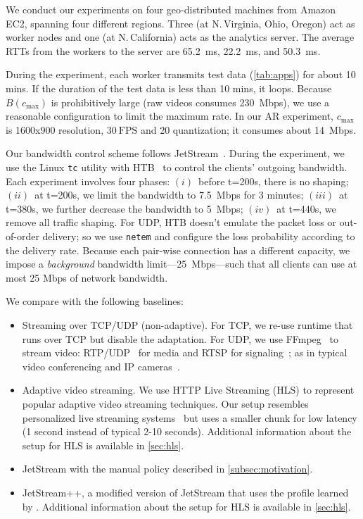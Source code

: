  We conduct our experiments on four geo-distributed
machines from Amazon EC2, spanning four different regions. Three (at
N.\,Virginia, Ohio, Oregon) act as worker nodes and one (at N.\,California) acts
as the analytics server. The average RTTs from the workers to the server are
\SI{65.2}{\ms}, \SI{22.2}{\ms}, and \SI{50.3}{ms}.

During the experiment, each worker transmits test data (\autoref{tab:apps}) for
about 10 mins. If the duration of the test data is less than 10 mins, it
loops. Because $B(c_{\max})$ is prohibitively large (raw videos consumes
\SI{230}{Mbps}), we use a reasonable configuration to limit the maximum rate. In
our AR experiment, $c_{\max}$ is 1600x900 resolution, \(30~\text{FPS}\) and 20
quantization; it consumes about \SI{14}{Mbps}.

Our bandwidth control scheme follows JetStream~\cite{rabkin2014aggregation}.
During the experiment, we use the Linux \texttt{tc} utility with HTB~\cite{htb,
  lartc} to control the clients' outgoing bandwidth. Each experiment involves
four phases: $(i)$~before t=200s, there is no shaping; $(ii)$~at t=200s, we
limit the bandwidth to \SI{7.5}{Mbps} for 3 minutes; $(iii)$~at t=380s, we
further decrease the bandwidth to \SI{5}{Mbps}; $(iv)$~at t=440s, we remove all
traffic shaping. For UDP, HTB doesn't emulate the packet loss or out-of-order
delivery; so we use \texttt{netem} and configure the loss probability according
to the delivery rate. Because each pair-wise connection has a different
capacity, we impose a \textit{background} bandwidth limit---\SI{25}{Mbps}---such
that all clients can use at most 25 Mbps of network bandwidth.

We compare \sysname{} with the following baselines:

\begin{itemize}

\item Streaming over TCP/UDP (non-adaptive). For TCP, we re-use \sysname{}
  runtime that runs over TCP but disable the adaptation. For UDP, we use
  FFmpeg~\cite{bellard2012ffmpeg} to stream video:
  RTP/UDP~\cite{schulzrinne2006rtp} for media and RTSP for
  signaling~\cite{schulzrinne1998rtsp}; as in typical video conferencing and IP
  cameras~\cite{durresi2005rtp, king2009cisco}.

\item Adaptive video streaming. We use HTTP Live Streaming (HLS) to
  represent popular adaptive video streaming techniques. Our setup
  resembles personalized live streaming systems~\cite{wang2016anatomy}
  but uses a smaller chunk for low latency (1 second instead of
  typical 2-10 seconds). Additional information about the setup for
  HLS is available in \autoref{sec:hls}.

\item JetStream with the manual policy described in \autoref{subsec:motivation}.

\item JetStream++, a modified version of JetStream that uses the
  profile learned by \sysname{}. Additional information about the
  setup for HLS is available in \autoref{sec:hls}.

\end{itemize}

